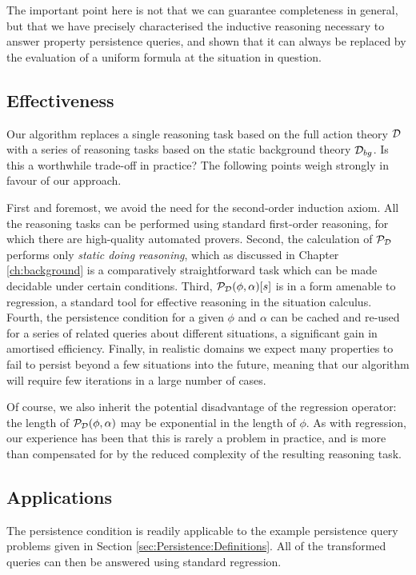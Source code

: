 The important point here is not that we can guarantee completeness
in general, but that we have precisely characterised the inductive
reasoning necessary to answer property persistence queries, and shown
that it can always be replaced by the evaluation of a uniform formula
at the situation in question.


\subsection{Effectiveness\label{sec:Persistence:Effectiveness}}

Our algorithm replaces a single reasoning task based on the full action
theory $\mathcal{D}$ with a series of reasoning tasks based on the static
background theory $\mathcal{D}_{bg}$. Is this a worthwhile trade-off in practice?
The following points weigh strongly in favour of our approach.

First and foremost, we avoid the need for the second-order induction
axiom. All the reasoning tasks can be performed using standard first-order
reasoning, for which there are high-quality automated provers. Second,
the calculation of $\mathcal{P}_{\mathcal{D}}$ performs only \emph{static doing
reasoning}, which as discussed in Chapter \ref{ch:background} is
a comparatively straightforward task which can be made decidable under
certain conditions. Third, $\mathcal{P}_{\mathcal{D}}(\phi,\alpha)[s]$ is in a form
amenable to regression, a standard tool for effective reasoning in
the situation calculus. Fourth, the persistence condition for a given
$\phi$ and $\alpha$ can be cached and re-used for a series of related
queries about different situations, a significant gain in amortised
efficiency. Finally, in realistic domains we expect many properties
to fail to persist beyond a few situations into the future, meaning
that our algorithm will require few iterations in a large number of
cases.

Of course, we also inherit the potential disadvantage of the regression
operator: the length of $\mathcal{P}_{\mathcal{D}}(\phi,\alpha)$ may be exponential
in the length of $\phi$. As with regression, our experience has been
that this is rarely a problem in practice, and is more than compensated
for by the reduced complexity of the resulting reasoning task.


\subsection{Applications}

The persistence condition is readily applicable to the example persistence
query problems given in Section \ref{sec:Persistence:Definitions}.
All of the transformed queries can then be answered using standard
regression.\\


